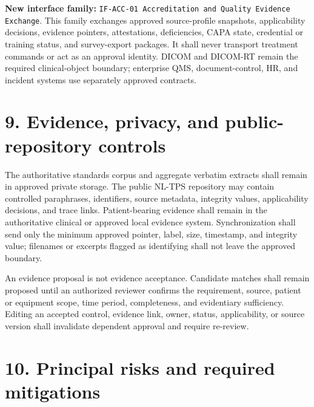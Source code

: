\documentclass[11pt,letterpaper]{article}
\begin{document}
\textbf{New interface family: }\texttt{IF-ACC-01 Accreditation and Quality Evidence Exchange}. This family exchanges approved source-profile snapshots, applicability decisions, evidence pointers, attestations, deficiencies, CAPA state, credential or training status, and survey-export packages. It shall never transport treatment commands or act as an approval identity. DICOM and DICOM-RT remain the required clinical-object boundary; enterprise QMS, document-control, HR, and incident systems use separately approved contracts.

\section{9. Evidence, privacy, and public-repository controls}

The authoritative standards corpus and aggregate verbatim extracts shall remain in approved private storage. The public NL-TPS repository may contain controlled paraphrases, identifiers, source metadata, integrity values, applicability decisions, and trace links. Patient-bearing evidence shall remain in the authoritative clinical or approved local evidence system. Synchronization shall send only the minimum approved pointer, label, size, timestamp, and integrity value; filenames or excerpts flagged as identifying shall not leave the approved boundary.

An evidence proposal is not evidence acceptance. Candidate matches shall remain proposed until an authorized reviewer confirms the requirement, source, patient or equipment scope, time period, completeness, and evidentiary sufficiency. Editing an accepted control, evidence link, owner, status, applicability, or source version shall invalidate dependent approval and require re-review.

\section{10. Principal risks and required mitigations}
\end{document}

